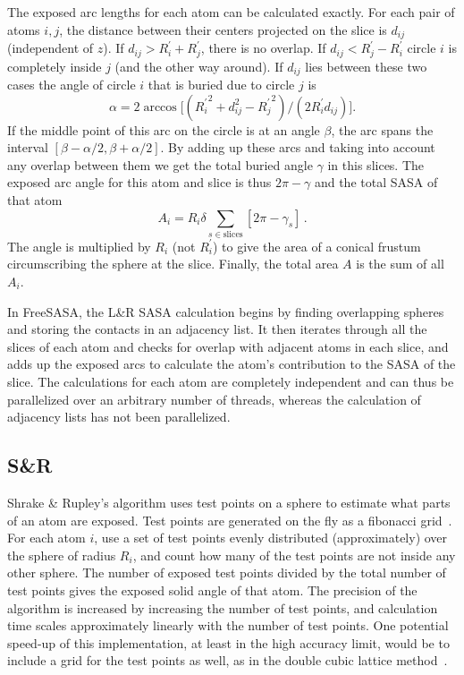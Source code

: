\documentclass[a4paper,11pt]{article}
\begin{document}
The exposed arc lengths for each atom can be calculated exactly. For
each pair of atoms $i,j$, the distance between their centers projected
on the slice is $d_{ij}$ (independent of $z$). If $d_{ij} > R_i^\prime
+ R_j^\prime$, there is no overlap. If $d_{ij} < R_j^\prime -
R_i^\prime$ circle $i$ is completely inside $j$ (and the other way
around). If $d_{ij}$ lies between these two cases the angle of circle
$i$ that is buried due to circle $j$ is 
\begin{equation}
  \alpha = 2\arccos
  \bigl[({R_i^\prime}^2_{\,} + d_{ij}^2 - {R_{j}^\prime}^2_{\,})/(2R_i^\prime
  d_{ij})\bigr].
\end{equation}
If the middle point of this arc on the circle is at an angle $\beta$,
the arc spans the interval $[\beta-\alpha/2,\beta+\alpha/2]$. By
adding up these arcs and taking into account any overlap between them
we get the total buried angle $\gamma$ in this slices. The exposed
arc angle for this atom and slice is thus $2\pi-\gamma$ and the
total SASA of that atom
\begin{equation}\label{eq:LR_SASA}
  A_i =R_i \delta \sum_{s\in\text{slices}}
    \left[2\pi-\gamma_s\right]\,.
\end{equation}
The angle is multiplied by $R_i$ (not $R_i^\prime$) to give the area
of a conical frustum circumscribing the sphere at the slice. Finally,
the total area $A$ is the sum of all $A_i$.

In FreeSASA, the L\&R SASA calculation begins by finding overlapping
spheres and storing the contacts in an adjacency list. It then
iterates through all the slices of each atom and checks for overlap
with adjacent atoms in each slice, and adds up the exposed arcs to
calculate the atom's contribution to the SASA of the slice. The
calculations for each atom are completely independent and can thus be
parallelized over an arbitrary number of threads, whereas the
calculation of adjacency lists has not been parallelized.

\subsection{S\&R}

Shrake \& Rupley's algorithm uses test points on a sphere to estimate
what parts of an atom are exposed. Test points are generated on the
fly as a fibonacci grid~\cite{FibonacciGrid}. For each atom $i$, use
a set of test points evenly distributed (approximately) over the
sphere of radius $R_i$, and count how many of the test points are not
inside any other sphere. The number of exposed test points divided by
the total number of test points gives the exposed solid angle of that
atom. The precision of the algorithm is increased by increasing the
number of test points, and calculation time scales approximately
linearly with the number of test points.  One potential speed-up of
this implementation, at least in the high accuracy limit, would be to
include a grid for the test points as well, as in the double cubic
lattice method~\cite{DCLM}.
 
\end{document}
